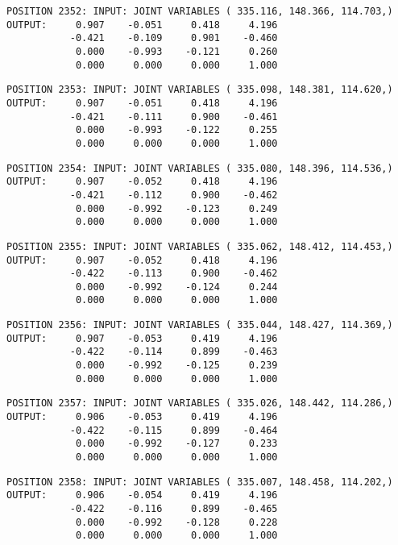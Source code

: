 \begin{verbatim}
POSITION 2352: INPUT: JOINT VARIABLES ( 335.116, 148.366, 114.703,)
OUTPUT:     0.907    -0.051     0.418     4.196
           -0.421    -0.109     0.901    -0.460
            0.000    -0.993    -0.121     0.260
            0.000     0.000     0.000     1.000
\end{verbatim} \pagebreak[1]\begin{verbatim}
POSITION 2353: INPUT: JOINT VARIABLES ( 335.098, 148.381, 114.620,)
OUTPUT:     0.907    -0.051     0.418     4.196
           -0.421    -0.111     0.900    -0.461
            0.000    -0.993    -0.122     0.255
            0.000     0.000     0.000     1.000
\end{verbatim} \pagebreak[1]\begin{verbatim}
POSITION 2354: INPUT: JOINT VARIABLES ( 335.080, 148.396, 114.536,)
OUTPUT:     0.907    -0.052     0.418     4.196
           -0.421    -0.112     0.900    -0.462
            0.000    -0.992    -0.123     0.249
            0.000     0.000     0.000     1.000
\end{verbatim} \pagebreak[1]\begin{verbatim}
POSITION 2355: INPUT: JOINT VARIABLES ( 335.062, 148.412, 114.453,)
OUTPUT:     0.907    -0.052     0.418     4.196
           -0.422    -0.113     0.900    -0.462
            0.000    -0.992    -0.124     0.244
            0.000     0.000     0.000     1.000
\end{verbatim} \pagebreak[1]\begin{verbatim}
POSITION 2356: INPUT: JOINT VARIABLES ( 335.044, 148.427, 114.369,)
OUTPUT:     0.907    -0.053     0.419     4.196
           -0.422    -0.114     0.899    -0.463
            0.000    -0.992    -0.125     0.239
            0.000     0.000     0.000     1.000
\end{verbatim} \pagebreak[1]\begin{verbatim}
POSITION 2357: INPUT: JOINT VARIABLES ( 335.026, 148.442, 114.286,)
OUTPUT:     0.906    -0.053     0.419     4.196
           -0.422    -0.115     0.899    -0.464
            0.000    -0.992    -0.127     0.233
            0.000     0.000     0.000     1.000
\end{verbatim} \pagebreak[1]\begin{verbatim}
POSITION 2358: INPUT: JOINT VARIABLES ( 335.007, 148.458, 114.202,)
OUTPUT:     0.906    -0.054     0.419     4.196
           -0.422    -0.116     0.899    -0.465
            0.000    -0.992    -0.128     0.228
            0.000     0.000     0.000     1.000
\end{verbatim} \pagebreak[1]\begin{verbatim}

\end{verbatim}
